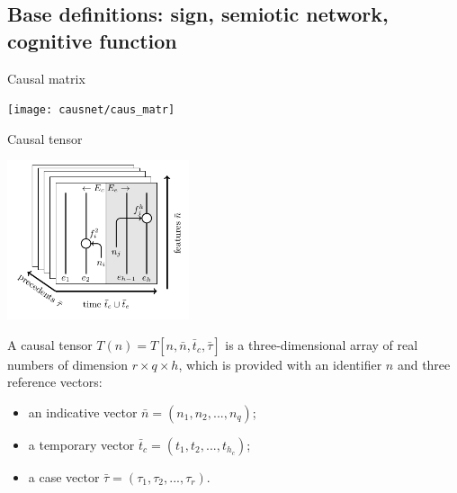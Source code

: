 \documentclass[default]{beamer}
\begin{document}
	\subsection{Base definitions: sign, semiotic network, cognitive function}
	\begin{frame}{Causal matrix}                             
		\begin{center}
			\texttt{[image: causnet/caus\_matr]}
		\end{center}
		
		\vspace{-5pt}
		\nocite{*}
		\printbibliography[keyword={matrix}, resetnumbers=true]
	\end{frame}
	\begin{frame}{Causal tensor}                             
		\begin{center}
			\includegraphics[width=0.4\textwidth]{causnet/caus_tensor_en}
		\end{center}
		
		A causal tensor $T (n)=T[n,\bar{n}, {{\bar{t}}_{c}},\bar{\tau }]$ is a three-dimensional array of real numbers of dimension $r\times q\times h$, which is provided with an identifier $n$ and three reference vectors: 
		\begin{itemize}
			\item an indicative vector $\bar{n}=({{n}_{1}},{{n}_{2}},..., {{n}_{q}})$; 
			\item a temporary vector ${{\bar{t}}_{c}}=({{t}_{1}},{{t}_{2}},...,{{t}_{{{h}_{c}}}})$; 
			\item a case vector $\bar{\tau } =({{\tau }_{1}},{{\tau }_{2}},..., {{\tau }_{r}})$.
		\end{itemize}

	\end{frame}
	
\end{document}

